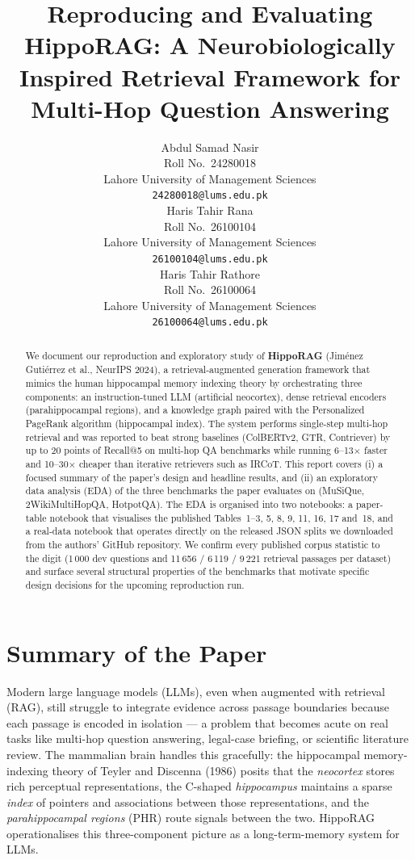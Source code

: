\documentclass{article}
\title{Reproducing and Evaluating HippoRAG: A Neurobiologically Inspired Retrieval Framework for Multi-Hop Question Answering}
\author{%
  Abdul Samad Nasir \\
  Roll No.\ 24280018 \\
  Lahore University of Management Sciences \\
  \texttt{24280018@lums.edu.pk} \\
  \And
  Haris Tahir Rana \\
  Roll No.\ 26100104 \\
  Lahore University of Management Sciences \\
  \texttt{26100104@lums.edu.pk} \\
  \And
  Haris Tahir Rathore \\
  Roll No.\ 26100064 \\
  Lahore University of Management Sciences \\
  \texttt{26100064@lums.edu.pk} \\
}
\begin{document}
\maketitle

\begin{abstract}
We document our reproduction and exploratory study of \textbf{HippoRAG} (Jim\'enez Guti\'errez et al., NeurIPS 2024), a retrieval-augmented generation framework that mimics the human hippocampal memory indexing theory by orchestrating three components: an instruction-tuned LLM (artificial neocortex), dense retrieval encoders (parahippocampal regions), and a knowledge graph paired with the Personalized PageRank algorithm (hippocampal index). The system performs single-step multi-hop retrieval and was reported to beat strong baselines (ColBERTv2, GTR, Contriever) by up to 20 points of Recall@5 on multi-hop QA benchmarks while running 6--13$\times$ faster and 10--30$\times$ cheaper than iterative retrievers such as IRCoT. This report covers (i) a focused summary of the paper's design and headline results, and (ii) an exploratory data analysis (EDA) of the three benchmarks the paper evaluates on (MuSiQue, 2WikiMultiHopQA, HotpotQA). The EDA is organised into two notebooks: a paper-table notebook that visualises the published Tables~1--3, 5, 8, 9, 11, 16, 17 and~18, and a real-data notebook that operates directly on the released JSON splits we downloaded from the authors' GitHub repository. We confirm every published corpus statistic to the digit (1\,000 dev questions and 11\,656 / 6\,119 / 9\,221 retrieval passages per dataset) and surface several structural properties of the benchmarks that motivate specific design decisions for the upcoming reproduction run.
\end{abstract}

\section{Summary of the Paper}

Modern large language models (LLMs), even when augmented with retrieval (RAG), still struggle to integrate evidence across passage boundaries because each passage is encoded in isolation --- a problem that becomes acute on real tasks like multi-hop question answering, legal-case briefing, or scientific literature review. The mammalian brain handles this gracefully: the hippocampal memory-indexing theory of Teyler and Discenna (1986) posits that the \emph{neocortex} stores rich perceptual representations, the C-shaped \emph{hippocampus} maintains a sparse \emph{index} of pointers and associations between those representations, and the \emph{parahippocampal regions} (PHR) route signals between the two. HippoRAG operationalises this three-component picture as a long-term-memory system for LLMs.
\end{document}
